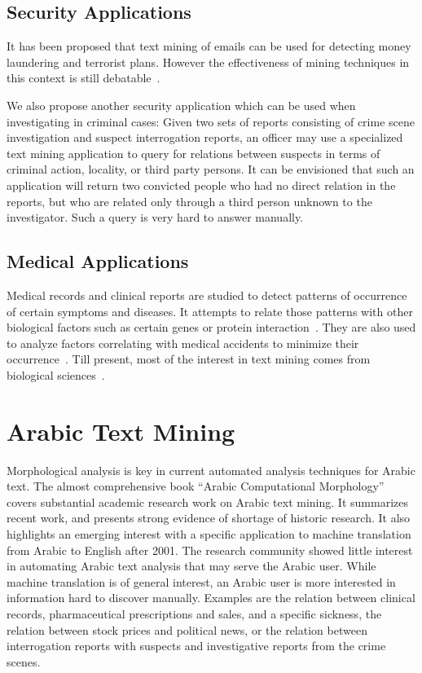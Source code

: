 \documentclass[a4,12pt]{report}
\begin{document}
\subsection{Security Applications} 
	It has been proposed that text mining of emails can be used for detecting money laundering and 
	terrorist plans. However the effectiveness of mining techniques in this context is still debatable~\cite{Jonas:06,Federici:07}.
	
	We also propose another security application which can be used when investigating in criminal cases:
	Given two sets of reports consisting of crime scene investigation and suspect interrogation reports, 
	an officer may use a specialized text mining application to query for relations between suspects in terms of 
	criminal action, locality, or third party persons. %
	It can be envisioned that such an application will return two convicted people who had no direct relation
	in the reports, but who are related only through a third person unknown to the investigator. 
	Such a query is very hard to answer manually.

\subsection{Medical Applications} 
	Medical records and clinical reports are studied to detect
	patterns of occurrence of certain symptoms and diseases. It attempts to relate those patterns with
	other biological factors such as certain 
	genes or protein interaction~\cite{blaschke:99, Krallinger:05, Rebholz-Schuhmann:07, Cohen:08, Tsuruoka:08}.
	They are also used to analyze factors correlating with medical accidents to minimize their occurrence~\cite{Kimura:08}.
	Till present, most of the interest in text mining comes from biological sciences~\cite{Giannopoulou:08}.



\section{Arabic Text Mining}

Morphological analysis is key in current automated 
analysis techniques for Arabic text.
The almost comprehensive book 
``Arabic Computational Morphology''~\cite{Sou07}
covers substantial academic research work on Arabic text mining.
It summarizes recent work, and presents strong evidence of 
shortage of historic research. It also highlights  an emerging 
interest with a specific application to machine 
translation from Arabic to English after 2001.
The research community showed little interest in 
automating Arabic text analysis that may serve
the Arabic user.
While machine translation is of general interest, 
an Arabic user is more interested in 
information hard to discover manually.
Examples are the relation between clinical records, pharmaceutical 
prescriptions and sales, and a specific sickness,
the relation
between stock prices and political news, or the 
relation between interrogation reports with suspects
and investigative reports from the crime scenes.
\end{document}
